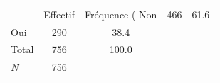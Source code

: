 {
\def\sym#1{\ifmmode^{#1}\else\(^{#1}\)\fi}
\begin{tabular}{l*{1}{cc}}
\toprule
            &    Effectif&Fréquence (%
\midrule
Non         &         466&        61.6\\
Oui         &         290&        38.4\\
Total       &         756&       100.0\\
\midrule
\(N\)       &         756&            \\
\bottomrule
\end{tabular}
}
